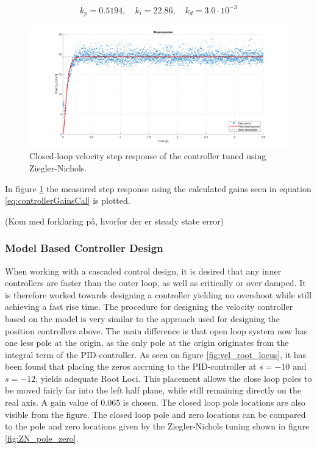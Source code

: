 \documentclass[../../main.tex]{subfiles}
\begin{document}
\begin{equation}
    k_p = 0.5194, \quad k_i = 22.86, \quad k_d = 3.0 \cdot 10^{-3}
    \label{eq:controllerGainsCal}
\end{equation}


\begin{figure}
    \centering
    \includegraphics[width = 1\textwidth]{Sections/System_Design/Images/Step_Implemented_NZ.png}
    \caption{Closed-loop velocity step response of the controller tuned using Ziegler-Nichols.}
    \label{fig:NZ_implemented}
\end{figure}


In figure \ref{fig:NZ_implemented} the measured step response using the calculated gains seen in equation \ref{eq:controllerGainsCal} is plotted. 

(Kom med forklaring på, hvorfor der er steady state error)

\subsubsection{Model Based Controller Design}
When working with a cascaded control design, it is desired that any inner controllers are faster than the outer loop, as well as critically or over damped. It is therefore worked towards designing a controller yielding no overshoot while still achieving a fast rise time.
The procedure for designing the velocity controller based on the model is very similar to the approach used for designing the position controllers above. The main difference is that open loop system now has one less pole at the origin, as the only pole at the origin originates from the integral term of the PID-controller. As seen on figure \ref{fig:vel_root_locus}, it has been found that placing the zeros accruing to the PID-controller at $s = -10$ and $s = -12$, yields adequate Root Loci. This placement allows the close loop poles to be moved fairly far into the left half plane, while still remaining directly on the real axis. A gain value of $0.065$ is chosen. The closed loop pole locations are also visible from the figure. The closed loop pole and zero locations can be compared to the pole and zero locations given by the Ziegler-Nichols tuning shown in figure \ref{fig:ZN_pole_zero}.
\end{document}

